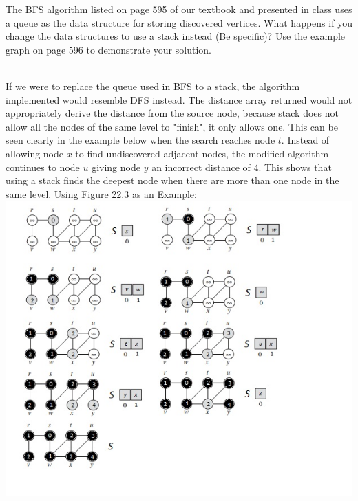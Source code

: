 \documentclass[addpoints,11pt]{exam}
\begin{document}
\begin{questions}
\question[5]
The BFS algorithm listed on page 595 of our textbook and presented in class uses a queue as the data structure for storing discovered vertices.  What happens if you change the data structures to use a stack instead (Be specific)?  Use the example graph on page 596 to demonstrate your solution.   
\begin{solutionorbox}\\
	If we were to replace the queue used in BFS to a stack, the algorithm implemented would resemble DFS instead. The distance array returned would not appropriately derive the distance from the source node, because stack does not allow all the nodes of the same level to "finish", it only allows one. This can be seen clearly in the example below when the search reaches node $t$. Instead of allowing node $x$ to find undiscovered adjacent nodes, the modified algorithm continues to node $u$ giving node $y$ an incorrect distance of 4. This shows that using a stack finds the deepest node when there are more than one node in the same level. Using Figure 22.3 as an Example: \\
	\includegraphics[width=1\textwidth]{bfsstack.jpg}
	
\end{solutionorbox}
	
\ifprintanswers
\newpage
\else
\bigskip
\fi




\end{questions}
\end{document}
